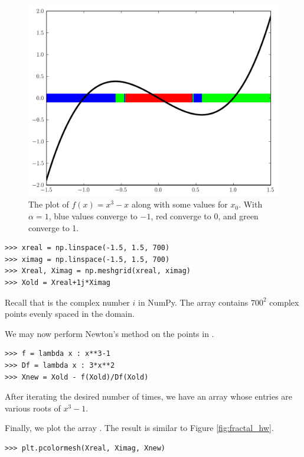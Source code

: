 \begin{figure}[h]
    \centering
    \includegraphics[scale=0.5]{figures/fractal1d.pdf}
    \caption{The plot of $f(x) = x^3 -x$ along with some values for $x_0$. With $\alpha=1$,
    blue values converge to $-1$, red converge to 0, and green converge to 1.}
    \label{fig:fractal_1d}
\end{figure}

\begin{lstlisting}
>>> xreal = np.linspace(-1.5, 1.5, 700)
>>> ximag = np.linspace(-1.5, 1.5, 700)
>>> Xreal, Ximag = np.meshgrid(xreal, ximag)
>>> Xold = Xreal+1j*Ximag
\end{lstlisting}

Recall that  is the complex number $i$ in NumPy.
The array  contains $700^2$ complex points evenly spaced in the domain.

We may now perform Newton's method on the points in .

\begin{lstlisting}
>>> f = lambda x : x**3-1
>>> Df = lambda x : 3*x**2
>>> Xnew = Xold - f(Xold)/Df(Xold)
\end{lstlisting}

After iterating the desired number of times, we have an array  whose entries are various roots of $x^3-1$.

Finally, we plot the array . The result is similar to Figure \ref{fig:fractal_hw}.

\begin{lstlisting}
>>> plt.pcolormesh(Xreal, Ximag, Xnew)
\end{lstlisting}

